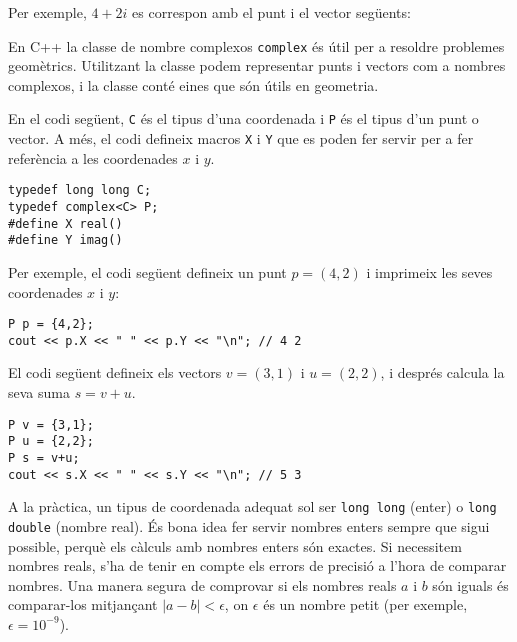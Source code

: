 Per exemple, $4+2i$ es correspon amb el punt i el vector següents:


\begin{center}
\end{center}



En C++ la classe de nombre complexos \texttt{complex} és útil per a
resoldre problemes geomètrics. Utilitzant la classe podem representar
punts i vectors com a nombres complexos, i la classe conté eines que
són útils en geometria.

En el codi següent, \texttt{C} és el tipus d'una coordenada i
\texttt{P} és el tipus d'un punt o vector. A més, el codi defineix
macros \texttt{X} i \texttt{Y} que es poden fer servir per a fer
referència a les coordenades $x$ i $y$.


\begin{lstlisting}
typedef long long C;
typedef complex<C> P;
#define X real()
#define Y imag()
\end{lstlisting}


Per exemple, el codi següent defineix un punt $p=(4,2)$ i imprimeix
les seves coordenades $x$ i $y$:


\begin{lstlisting}
P p = {4,2};
cout << p.X << " " << p.Y << "\n"; // 4 2
\end{lstlisting}


El codi següent defineix els vectors $v=(3,1)$ i $u=(2,2)$, i després
calcula la seva suma $s=v+u$.


\begin{lstlisting}
P v = {3,1};
P u = {2,2};
P s = v+u;
cout << s.X << " " << s.Y << "\n"; // 5 3
\end{lstlisting}


A la pràctica, un tipus de coordenada adequat sol ser \texttt{long
  long} (enter) o \texttt{long double} (nombre real). És bona idea fer
servir nombres enters sempre que sigui possible, perquè els càlculs
amb nombres enters són exactes. Si necessitem nombres reals, s'ha de
tenir en compte els errors de precisió a l'hora de comparar
nombres. Una manera segura de comprovar si els nombres reals $a$ i $b$
són iguals és comparar-los mitjançant $|a-b|<\epsilon$, on $\epsilon$
és un nombre petit (per exemple, $\epsilon=10^{-9}$).

